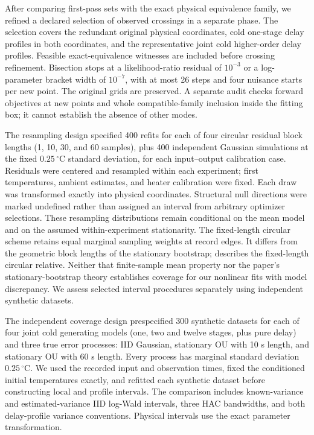 After comparing first-pass sets with the exact physical equivalence family,
we refined a declared selection of observed crossings in a separate phase.
The selection covers the redundant original physical coordinates, cold
one-stage delay profiles in both coordinates, and the representative joint
cold higher-order delay profiles. Feasible exact-equivalence witnesses are
included before crossing refinement. Bisection stops at a likelihood-ratio
residual of $10^{-3}$ or a log-parameter bracket width of $10^{-7}$, with at
most 26 steps and four nuisance starts per new point. The original grids are
preserved. A separate audit checks forward objectives at new points and whole
compatible-family inclusion inside the fitting box; it cannot establish the
absence of other modes.

The resampling design specified 400 refits for each of four circular residual
block lengths (1, 10, 30, and 60 samples), plus 400 independent Gaussian
simulations at the fixed $0.25\,{}^\circ\mathrm C$ standard deviation, for each
input--output calibration case. Residuals were centered and resampled within
each experiment; first temperatures, ambient estimates, and heater calibration
were fixed. Each draw was transformed exactly into physical coordinates.
Structural null directions were marked undefined rather than assigned an interval
from arbitrary optimizer selections. These resampling distributions remain
conditional on the mean model and on the assumed within-experiment stationarity.
The fixed-length circular scheme retains equal marginal sampling weights at
record edges. It differs from the geometric block lengths of the stationary
bootstrap; \citet[physical PDF p.~3, Remark 2]{politis-1994-stationary} describes
the fixed-length circular relative. Neither that finite-sample mean property nor
the paper's stationary-bootstrap theory establishes coverage for our nonlinear
fits with model discrepancy. We assess selected interval procedures separately
using independent synthetic datasets.

The independent coverage design prespecified 300 synthetic datasets for each
of four joint cold generating models (one, two and twelve stages, plus pure
delay) and three true error processes: IID Gaussian, stationary OU with 10 s
length, and stationary OU with 60 s length. Every process has marginal standard
deviation $0.25\,{}^\circ\mathrm C$. We used the recorded input and observation
times, fixed the conditioned initial temperatures exactly, and refitted each
synthetic dataset before constructing local and profile intervals. The
comparison includes known-variance and estimated-variance IID log-Wald
intervals, three HAC bandwidths, and both delay-profile variance conventions.
Physical intervals use the exact parameter transformation.

